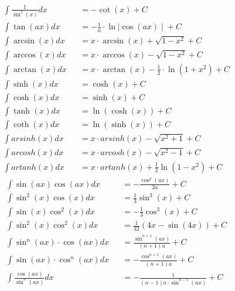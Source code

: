 \begin{small}
\begin{align*}
         & \int \frac{1}{\sin^2(x)}dx     &  & = -\cot(x)+C                                                    \\
         & \int \tan(ax) dx               &  & = -\frac{1}{a} \cdot \ln{\mid \cos(ax) \mid }+C                 \\
         & \int \arcsin (x) dx            &  & = x \cdot \arcsin(x)+\sqrt{1-x^2}+C                             \\
         & \int \arccos (x) dx            &  & = x \cdot \arccos(x)-\sqrt{1-x^2}+C                             \\
         & \int \arctan (x) dx            &  & = x \cdot \arctan(x)-\frac{1}{2} \cdot \ln(1+x^2)+C             \\
         & \int \sinh(x)dx                &  & = \cosh(x)+C                                                    \\
         & \int \cosh(x)dx                &  & = \sinh(x)+C                                                    \\
         & \int \tanh(x)dx                &  & = \ln(\cosh(x)) +C                                              \\
         & \int \coth(x)dx                &  & = \ln(\sinh(x))+C                                               \\
         & \int arsinh(x)dx               &  & = x \cdot arsinh(x) - \sqrt{x^2+1}+C                            \\
         & \int arcosh(x)dx               &  & = x \cdot arcosh(x) - \sqrt{x^2-1}+C                            \\
         & \int artanh(x)dx               &  & = x \cdot artanh(x) +\frac{1}{2}\ln(1-x^2)+C
    \end{align*}
    \begin{align*}
         & \int \sin(ax)\cos(ax) dx           &  & = -\frac{\cos^2(ax)}{2a}+C                 \\
         & \int \sin^2(x)\cos(x)dx            &  & =\frac{1}{3}\sin^3(x)+C                    \\
         & \int \sin(x)\cos^2(x)dx            &  & =-\frac{1}{3}\cos^3(x)+C                   \\
         & \int \sin^2(x)\cos^2(x)dx          &  & =\frac{1}{32}(4x-\sin(4x))+C               \\
         & \int \sin^n(ax)\cdot \cos(ax)dx    &  & =\frac{\sin^{n+1}(ax)}{(n+1)a}+C           \\
         & \int \sin(ax)\cdot \cos^n(ax)dx    &  & =-\frac{\cos^{n+1}(ax)}{(n+1)a}+C          \\
         & \int \frac{\cos(ax)}{\sin^n(ax)}dx &  & = -\frac{1}{(n-1)a \cdot \sin^{n-1}(ax)}+C
    \end{align*}
\end{small}

